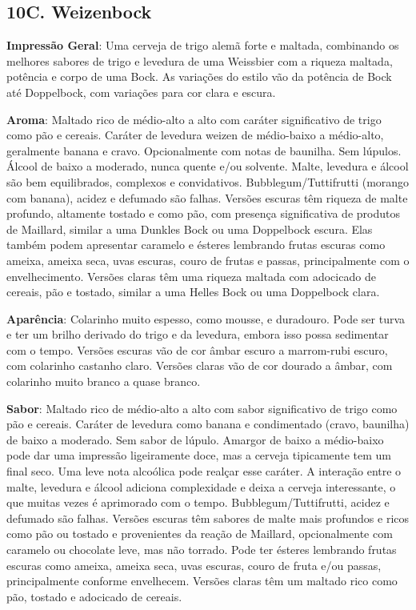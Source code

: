 \subsection*{10C. Weizenbock}
\textbf{Impressão Geral}: Uma cerveja de trigo alemã forte e maltada, combinando os melhores sabores de trigo e levedura de uma Weissbier com a riqueza maltada, potência e corpo de uma Bock. As variações do estilo vão da potência de Bock até Doppelbock, com variações para cor clara e escura.

\textbf{Aroma}: Maltado rico de médio-alto a alto com caráter significativo de trigo como pão e cereais. Caráter de levedura weizen de médio-baixo a médio-alto, geralmente banana e cravo. Opcionalmente com notas de baunilha. Sem lúpulos. Álcool de baixo a moderado, nunca quente e/ou solvente. Malte, levedura e álcool são bem equilibrados, complexos e convidativos. Bubblegum/Tuttifrutti (morango com banana), acidez e defumado são falhas.
Versões escuras têm riqueza de malte profundo, altamente tostado e como pão, com presença significativa de produtos de Maillard, similar a uma Dunkles Bock ou uma Doppelbock escura. Elas também podem apresentar caramelo e ésteres lembrando frutas escuras como ameixa, ameixa seca, uvas escuras, couro de frutas e passas, principalmente com o envelhecimento.
Versões claras têm uma riqueza maltada com adocicado de cereais, pão e tostado, similar a uma Helles Bock ou uma Doppelbock clara.

\textbf{Aparência}: Colarinho muito espesso, como mousse, e duradouro. Pode ser turva e ter um brilho derivado do trigo e da levedura, embora isso possa sedimentar com o tempo.
Versões escuras vão de cor âmbar escuro a marrom-rubi escuro, com colarinho castanho claro.
Versões claras vão de cor dourado a âmbar, com colarinho muito branco a quase branco.

\textbf{Sabor}: Maltado rico de médio-alto a alto com sabor significativo de trigo como pão e cereais. Caráter de levedura como banana e condimentado (cravo, baunilha) de baixo a moderado. Sem sabor de lúpulo. Amargor de baixo a médio-baixo pode dar uma impressão ligeiramente doce, mas a cerveja tipicamente tem um final seco. Uma leve nota alcoólica pode realçar esse caráter. A interação entre o malte, levedura e álcool adiciona complexidade e deixa a cerveja interessante, o que muitas vezes é aprimorado com o tempo. Bubblegum/Tuttifrutti, acidez e defumado são falhas.
Versões escuras têm sabores de malte mais profundos e ricos como pão ou tostado e provenientes da reação de Maillard, opcionalmente com caramelo ou chocolate leve, mas não torrado. Pode ter ésteres lembrando frutas escuras como ameixa, ameixa seca, uvas escuras, couro de fruta e/ou passas, principalmente conforme envelhecem.
Versões claras têm um maltado rico como pão, tostado e adocicado de cereais.

